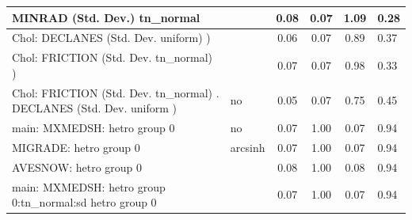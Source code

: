 \begin{table}
\begin{center}
\begin{tabular}{|l|l|c|c|c|l|}
			\hline
			MINRAD (Std. Dev.) tn_normal &  & 0.08 & 0.07 & 1.09 & 0.28 \\
			\hline
			 Chol: DECLANES (Std. Dev. uniform) ) &  & 0.06 & 0.07 & 0.89 & 0.37 \\
			\hline
			 Chol: FRICTION (Std. Dev. tn_normal) ) &  & 0.07 & 0.07 & 0.98 & 0.33 \\
			\hline
			 Chol: FRICTION (Std. Dev. tn_normal) . DECLANES (Std. Dev.   uniform ) & no & 0.05 & 0.07 & 0.75 & 0.45 \\
			\hline
			main: MXMEDSH: hetro group 0 & no & 0.07 & 1.00 & 0.07 & 0.94 \\
			\hline
			MIGRADE: hetro group 0 & arcsinh & 0.07 & 1.00 & 0.07 & 0.94 \\
			\hline
			AVESNOW: hetro group 0 &  & 0.08 & 1.00 & 0.08 & 0.94 \\
			\hline
			main: MXMEDSH: hetro group 0:tn_normal:sd  hetro group 0 &  & 0.07 & 1.00 & 0.07 & 0.94 \\
			\hline
		\end{tabular}
	\end{center}
\end{table}